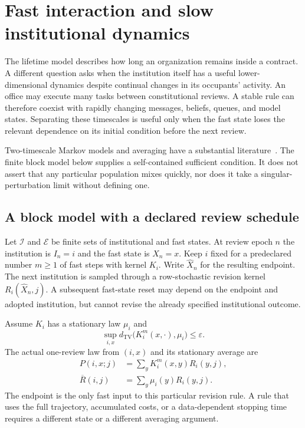 \documentclass[11pt,letterpaper]{article}
\theoremstyle{plain}
\theoremstyle{definition}
\theoremstyle{remark}
\newcommand{\TV}{d_{\mathrm{TV}}}
\begin{document}
\section{Fast interaction and slow institutional dynamics}\label{sec:multiscale}

The lifetime model describes how long an organization remains inside a contract. A different question asks when the institution itself has a useful lower-dimensional dynamics despite continual changes in its occupants' activity. An office may execute many tasks between constitutional reviews. A stable rule can therefore coexist with rapidly changing messages, beliefs, queues, and model states. Separating these timescales is useful only when the fast state loses the relevant dependence on its initial condition before the next review.

Two-timescale Markov models and averaging have a substantial literature~\cite{yinzhang}. The finite block model below supplies a self-contained sufficient condition. It does not assert that any particular population mixes quickly, nor does it take a singular-perturbation limit without defining one.

\subsection{A block model with a declared review schedule}
Let $\mathcal I$ and $\mathcal E$ be finite sets of institutional and fast states. At review epoch $n$ the institution is $I_n=i$ and the fast state is $X_n=x$. Keep $i$ fixed for a predeclared number $m\geq1$ of fast steps with kernel $K_i$. Write $\widehat X_n$ for the resulting endpoint. The next institution is sampled through a row-stochastic revision kernel $R_i(\widehat X_n,j)$. A subsequent fast-state reset may depend on the endpoint and adopted institution, but cannot revise the already specified institutional outcome.

Assume $K_i$ has a stationary law $\mu_i$ and
\begin{equation}\label{eq:uniform-fast-mixing}
\sup_{i,x}\TV\bigl(K_i^m(x,\cdot),\mu_i\bigr)\leq\varepsilon.
\end{equation}
The actual one-review law from $(i,x)$ and its stationary average are
\begin{align}
P(i,x;j)&=\sum_y K_i^m(x,y)R_i(y,j),\label{eq:actual-review}\\
\overline R(i,j)&=\sum_y\mu_i(y)R_i(y,j).\label{eq:averaged-review}
\end{align}
The endpoint is the only fast input to this particular revision rule. A rule that uses the full trajectory, accumulated costs, or a data-dependent stopping time requires a different state or a different averaging argument.
\end{document}

